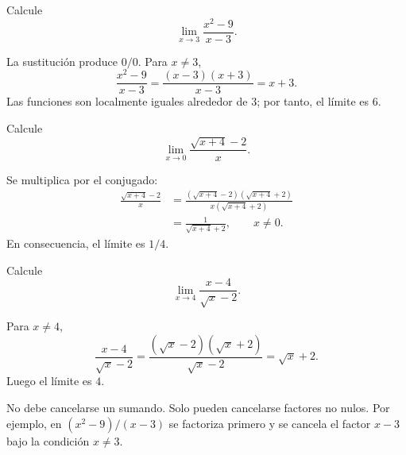 \begin{ejemplo}[factorización]
Calcule
\[
\lim_{x\to3}\frac{x^2-9}{x-3}.
\]
\end{ejemplo}
\ifmostrarSoluciones
\begin{solucion}
La sustitución produce $0/0$. Para $x\neq3$,
\[
\frac{x^2-9}{x-3}=\frac{(x-3)(x+3)}{x-3}=x+3.
\]
Las funciones son localmente iguales alrededor de $3$; por tanto, el límite es $6$.
\end{solucion}
\else\vspace{16mm}\fi

\begin{ejemplo}
Calcule
\[
\lim_{x\to0}\frac{\sqrt{x+4}-2}{x}.
\]
\end{ejemplo}
\ifmostrarSoluciones
\begin{solucion}
Se multiplica por el conjugado:
\begin{align*}
\frac{\sqrt{x+4}-2}{x}
&=\frac{(\sqrt{x+4}-2)(\sqrt{x+4}+2)}{x(\sqrt{x+4}+2)}\\
&=\frac{1}{\sqrt{x+4}+2},\qquad x\neq0.
\end{align*}
En consecuencia, el límite es $1/4$.
\end{solucion}
\else\vspace{18mm}\fi

\begin{ejemplo}
Calcule
\[
\lim_{x\to4}\frac{x-4}{\sqrt{x}-2}.
\]
\end{ejemplo}
\ifmostrarSoluciones
\begin{solucion}
Para $x\neq4$,
\[
\frac{x-4}{\sqrt{x}-2}
=\frac{(\sqrt{x}-2)(\sqrt{x}+2)}{\sqrt{x}-2}
=\sqrt{x}+2.
\]
Luego el límite es $4$.
\end{solucion}
\else\vspace{15mm}\fi

\begin{nota}
No debe cancelarse un sumando. Solo pueden cancelarse factores no nulos. Por ejemplo, en $(x^2-9)/(x-3)$ se factoriza primero y se cancela el factor $x-3$ bajo la condición $x\neq3$.
\end{nota}


